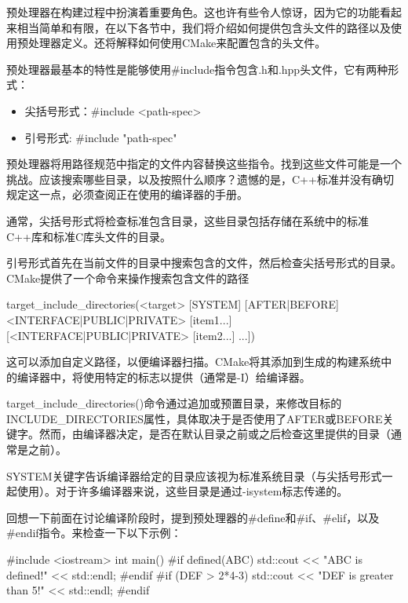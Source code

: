 
预处理器在构建过程中扮演着重要角色。这也许有些令人惊讶，因为它的功能看起来相当简单和有限，在以下各节中，我们将介绍如何提供包含头文件的路径以及使用预处理器定义。还将解释如何使用CMake来配置包含的头文件。


预处理器最基本的特性是能够使用\#include指令包含.h和.hpp头文件，它有两种形式：

\begin{itemize}
\item
尖括号形式：\#include <path-spec>

\item
引号形式: \#include "path-spec"
\end{itemize}

预处理器将用路径规范中指定的文件内容替换这些指令。找到这些文件可能是一个挑战。应该搜索哪些目录，以及按照什么顺序？遗憾的是，C++标准并没有确切规定这一点，必须查阅正在使用的编译器的手册。

通常，尖括号形式将检查标准包含目录，这些目录包括存储在系统中的标准C++库和标准C库头文件的目录。

引号形式首先在当前文件的目录中搜索包含的文件，然后检查尖括号形式的目录。
CMake提供了一个命令来操作搜索包含文件的路径

\begin{shell}
target_include_directories(<target> [SYSTEM] [AFTER|BEFORE]
                           <INTERFACE|PUBLIC|PRIVATE> [item1...]
                          [<INTERFACE|PUBLIC|PRIVATE> [item2...]
...])
\end{shell}

这可以添加自定义路径，以便编译器扫描。CMake将其添加到生成的构建系统中的编译器中，将使用特定的标志以提供（通常是-I）给编译器。

target\_include\_directories()命令通过追加或预置目录，来修改目标的INCLUDE\_DIRECTORIES属性，具体取决于是否使用了AFTER或BEFORE关键字。然而，由编译器决定，是否在默认目录之前或之后检查这里提供的目录（通常是之前）。

SYSTEM关键字告诉编译器给定的目录应该视为标准系统目录（与尖括号形式一起使用）。对于许多编译器来说，这些目录是通过-isystem标志传递的。


回想一下前面在讨论编译阶段时，提到预处理器的\#define和\#if、\#elif，以及\#endif指令。来检查一下以下示例：


\begin{cpp}
#include <iostream>
int main() {
#if defined(ABC)
    std::cout << "ABC is defined!" << std::endl;
#endif
#if (DEF > 2*4-3)
    std::cout << "DEF is greater than 5!" << std::endl;
#endif
}
\end{cpp}

